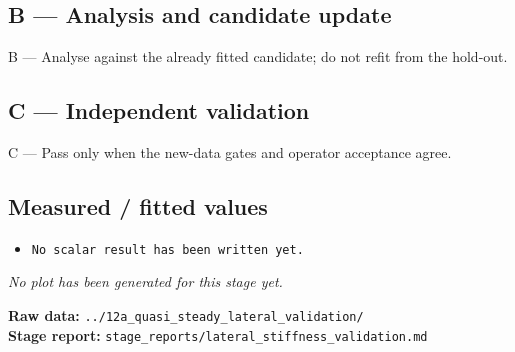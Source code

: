 \documentclass[11pt,a4paper]{article}
\begin{document}
\subsection*{B --- Analysis and candidate update}
B — Analyse against the already fitted candidate; do not refit from the hold-out.

\subsection*{C --- Independent validation}
C — Pass only when the new-data gates and operator acceptance agree.

\subsection*{Measured / fitted values}
\begin{itemize}\setlength\itemsep{0pt}
\item \texttt{No scalar result has been written yet.}
\end{itemize}

\textit{No plot has been generated for this stage yet.}

\vfill
\textbf{Raw data:} \texttt{../12a\_quasi\_steady\_lateral\_validation/}\\
\textbf{Stage report:} \texttt{stage\_reports/lateral\_stiffness\_validation.md}
\clearpage
\end{document}
